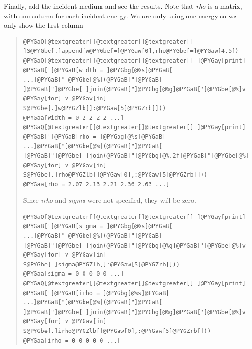 \documentclass[letterpaper,10pt,english]{sphinxmanual}
\begin{document}
Finally, add the incident medium and see the results.  Note that \emph{rho}
is a matrix, with one column for each incident energy.  We are only
using one energy so we only show the first column.
\begin{quote}

\begin{Verbatim}[commandchars=@\[\]]
@PYGaQ[@textgreater[]@textgreater[]@textgreater[] ]S@PYGbe[.]append(w@PYGbe[=]@PYGaw[0],rho@PYGbe[=]@PYGaw[4.5])
@PYGaQ[@textgreater[]@textgreater[]@textgreater[] ]@PYGay[print] @PYGaB["]@PYGaB[width = ]@PYGbg[@%s]@PYGaB[ ...]@PYGaB["]@PYGbe[@%](@PYGaB["]@PYGaB[ ]@PYGaB["]@PYGbe[.]join(@PYGaB["]@PYGbg[@%g]@PYGaB["]@PYGbe[@%]v @PYGay[for] v @PYGav[in] S@PYGbe[.]w@PYGZlb[]:@PYGaw[5]@PYGZrb[]))
@PYGaa[width = 0 2 2 2 2 ...]
@PYGaQ[@textgreater[]@textgreater[]@textgreater[] ]@PYGay[print] @PYGaB["]@PYGaB[rho = ]@PYGbg[@%s]@PYGaB[ ...]@PYGaB["]@PYGbe[@%](@PYGaB["]@PYGaB[ ]@PYGaB["]@PYGbe[.]join(@PYGaB["]@PYGbg[@%.2f]@PYGaB["]@PYGbe[@%]v @PYGay[for] v @PYGav[in] S@PYGbe[.]rho@PYGZlb[]@PYGaw[0],:@PYGaw[5]@PYGZrb[]))
@PYGaa[rho = 2.07 2.13 2.21 2.36 2.63 ...]
\end{Verbatim}

Since \emph{irho} and \emph{sigma} were not specified, they will be zero.

\begin{Verbatim}[commandchars=@\[\]]
@PYGaQ[@textgreater[]@textgreater[]@textgreater[] ]@PYGay[print] @PYGaB["]@PYGaB[sigma = ]@PYGbg[@%s]@PYGaB[ ...]@PYGaB["]@PYGbe[@%](@PYGaB["]@PYGaB[ ]@PYGaB["]@PYGbe[.]join(@PYGaB["]@PYGbg[@%g]@PYGaB["]@PYGbe[@%]v @PYGay[for] v @PYGav[in] S@PYGbe[.]sigma@PYGZlb[]:@PYGaw[5]@PYGZrb[]))
@PYGaa[sigma = 0 0 0 0 0 ...]
@PYGaQ[@textgreater[]@textgreater[]@textgreater[] ]@PYGay[print] @PYGaB["]@PYGaB[irho = ]@PYGbg[@%s]@PYGaB[ ...]@PYGaB["]@PYGbe[@%](@PYGaB["]@PYGaB[ ]@PYGaB["]@PYGbe[.]join(@PYGaB["]@PYGbg[@%g]@PYGaB["]@PYGbe[@%]v @PYGay[for] v @PYGav[in] S@PYGbe[.]irho@PYGZlb[]@PYGaw[0],:@PYGaw[5]@PYGZrb[]))
@PYGaa[irho = 0 0 0 0 0 ...]
\end{Verbatim}
\end{quote}
\end{document}
